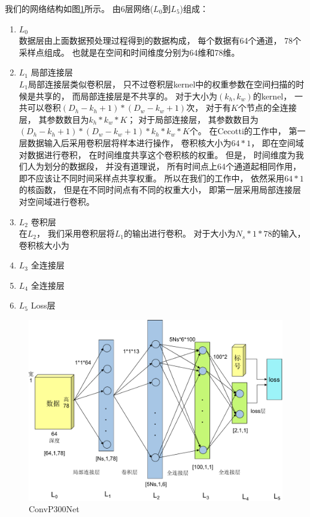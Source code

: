 我们的网络结构如图\ref{fig:p300cnn_network}所示。 由6层网络($L_0$到$L_5$)组成：
\begin{enumerate}
	\item $L_0$ \\
		数据层由上面数据预处理过程得到的数据构成， 每个数据有64个通道， 78个采样点组成。 也就是在空间和时间维度分别为64维和78维。 
	\item $L_1$ 局部连接层\\
		$L_1$局部连接层类似卷积层， 只不过卷积层kernel中的权重参数在空间扫描的时候是共享的， 而局部连接层是不共享的。 对于大小为$(k_h, k_w)$的kernel， 一共可以卷积$(D_h-k_h+1)*(D_w-k_w+1)$次， 对于有$K$个节点的全连接层， 其参数数目为$k_h*k_w*K$； 对于局部连接层， 其参数数目为$(D_h-k_h+1)*(D_w-k_w+1)*k_h*k_w*K$个。 在Cecotti的工作中\cite{cecotti2011convolutional}， 第一层数据输入后采用卷积层将样本进行操作， 卷积核大小为$64*1$， 即在空间域对数据进行卷积， 在时间维度共享这个卷积核的权重。 但是， 时间维度为我们人为划分的数据段， 并没有道理说， 所有时间点上64个通道起相同作用， 即不应该让不同时间采样点共享权重。 所以在我们的工作中， 依然采用$64*1$的核函数， 但是在不同时间点有不同的权重大小， 即第一层采用局部连接层对空间域进行卷积。	
		
	\item $L_2$ 卷积层\\
		在$L_2$， 我们采用卷积层将$L_1$的输出进行卷积。 对于大小为$N_s*1*78$的输入， 卷积核大小为
	
	\item $L_3$ 全连接层\\
	\item $L_4$ 全连接层\\
	\item $L_5$ Loss层\\
\end{enumerate}



\begin{figure}[htb]
  \centering
  \includegraphics[scale=0.7]{Pictures/CNN/cnn_network-crop.pdf}
  \caption{ConvP300Net}\label{fig:p300cnn_network}
\end{figure}

